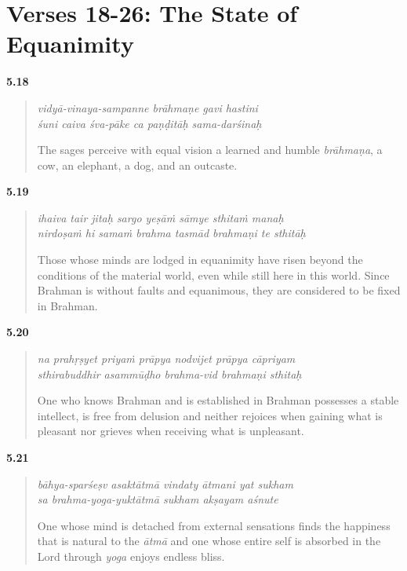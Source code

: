 \section{Verses 18-26: The State of Equanimity}\label{sec-verses-18-26-the-state-of-equanimity}


\par\noindent\textbf{5.18}\par
\begin{verse}
\textit{vidyā-vinaya-sampanne brāhmaṇe gavi hastini} \\
\textit{śuni caiva śva-pāke ca paṇḍitāḥ sama-darśinaḥ}

\noindent The sages perceive with equal vision a learned and humble \textit{brāhmaṇa}, a cow, an elephant, a dog, and an outcaste.
\end{verse}
\par



\par\noindent\textbf{5.19}\par
\begin{verse}
\textit{ihaiva tair jitaḥ sargo yeṣāṁ sāmye sthitaṁ manaḥ} \\
\textit{nirdoṣaṁ hi samaṁ brahma tasmād brahmaṇi te sthitāḥ}

\noindent Those whose minds are lodged in equanimity have risen beyond the conditions of the material world, even while still here in this world. Since Brahman is without faults and equanimous, they are considered to be fixed in Brahman.
\end{verse}
\par



\par\noindent\textbf{5.20}\par
\begin{verse}
\textit{na prahṛṣyet priyaṁ prāpya nodvijet prāpya cāpriyam} \\
\textit{sthirabuddhir asammūḍho brahma-vid brahmaṇi sthitaḥ}

\noindent One who knows Brahman and is established in Brahman possesses a stable intellect, is free from delusion and neither rejoices when gaining what is pleasant nor grieves when receiving what is unpleasant.
\end{verse}
\par



\par\noindent\textbf{5.21}\par
\begin{verse}
\textit{bāhya-sparśeṣv asaktātmā vindaty ātmani yat sukham} \\
\textit{sa brahma-yoga-yuktātmā sukham akṣayam aśnute}

\noindent One whose mind is detached from external sensations finds the happiness that is natural to the \textit{ātmā} and one whose entire self is absorbed in the Lord through \textit{yoga} enjoys endless bliss.
\end{verse}
\par



